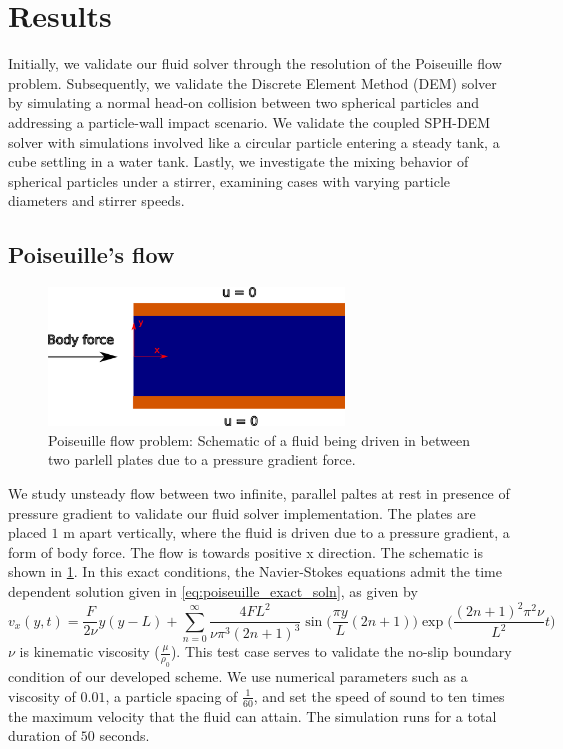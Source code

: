 \documentclass[preprint,12pt]{elsarticle}
\begin{document}
\FloatBarrier%
\section{Results}
\label{sec:results}
Initially, we validate our fluid solver through the resolution of the
Poiseuille flow problem. Subsequently, we validate the Discrete Element Method
(DEM) solver by simulating a normal head-on collision between two spherical
particles and addressing a particle-wall impact scenario.  We validate the
coupled SPH-DEM solver with simulations involved like a circular particle
entering a steady tank, a cube settling in a water tank.  Lastly, we
investigate the mixing behavior of spherical particles under a stirrer,
examining cases with varying particle diameters and stirrer speeds.


\FloatBarrier%
\subsection{Poiseuille's flow}
\label{sec:poiseuille_flow}

\begin{figure}[!htpb]
  \centering
  \includegraphics[width=0.7\textwidth]{images/fluid_01_benchmark_poisuelle/poiseuille_schematic}
  \caption{Poiseuille flow problem: Schematic of a fluid being driven in
    between two parlell plates due to a pressure gradient force.}
  \label{fig:poiseuille_schematic}
\end{figure}
We study unsteady flow between two infinite, parallel paltes at rest in
presence of pressure gradient to validate our fluid solver implementation.
The plates are placed $1$ m apart vertically, where the fluid is driven due to
a pressure gradient, a form of body force. The flow is towards positive x
direction. The schematic is shown in \cref{fig:poiseuille_schematic}.  In this
exact conditions, the Navier-Stokes equations admit the time dependent
solution given in \cref{eq:poiseuille_exact_soln}, as given by
\citet{morris1997modeling}
\begin{equation}
  \label{eq:poiseuille_exact_soln}
  v_x(y, t) = \frac{F}{2 \nu}y(y - L) + \sum_{n=0}^{\infty}\frac{4FL^2}{\nu \pi^3 (2n + 1)^3} \sin\bigg(\frac{\pi y}{L} (2 n + 1) \bigg) \exp\bigg(\frac{ (2 n + 1)^2 \pi^2 \nu}{L^2} t\bigg)
\end{equation}
$\nu$ is kinematic viscosity ($\frac{\mu}{\rho_0}$). This test case serves to
validate the no-slip boundary condition of our developed scheme. We use
numerical parameters such as a viscosity of $0.01$, a particle spacing of
$\frac{1}{60}$, and set the speed of sound to ten times the maximum velocity
that the fluid can attain. The simulation runs for a total duration of $50$
seconds.
\end{document}
